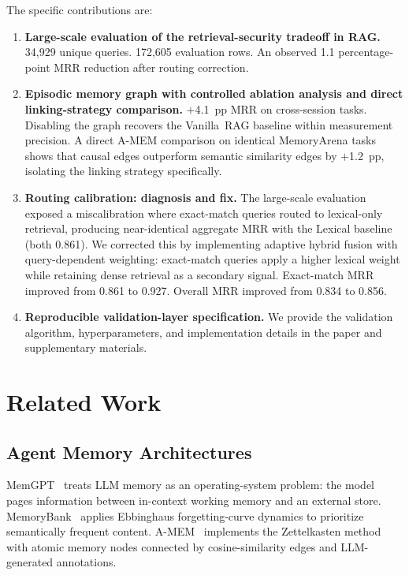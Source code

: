 \documentclass[sigconf]{acmart}
\begin{document}
The specific contributions are:

\begin{enumerate}
\item \textbf{Large-scale evaluation of the retrieval-security tradeoff in RAG.} 34,929 unique queries. 172,605 evaluation rows. An observed 1.1 percentage-point MRR reduction after routing correction.

\item \textbf{Episodic memory graph with controlled ablation analysis and
direct linking-strategy comparison.} $+$4.1~pp MRR on cross-session tasks.
Disabling the graph recovers the Vanilla~RAG baseline within measurement precision. A direct
A-MEM comparison on identical MemoryArena tasks shows that causal
edges outperform semantic similarity edges by $+$1.2~pp, isolating the
linking strategy specifically.

\item \textbf{Routing calibration: diagnosis and fix.} The large-scale
evaluation exposed a miscalibration where exact-match queries routed to
lexical-only retrieval, producing near-identical aggregate MRR with the Lexical
baseline (both 0.861). We corrected this by implementing adaptive hybrid
fusion with query-dependent weighting: exact-match queries apply a higher
lexical weight while retaining dense retrieval as a secondary signal. Exact-match MRR improved from 0.861 to 0.927. Overall MRR
improved from 0.834 to 0.856.

\item \textbf{Reproducible validation-layer specification.} We provide the
validation algorithm, hyperparameters, and implementation details in the
paper and supplementary materials.
\end{enumerate}

\section{Related Work}

\subsection{Agent Memory Architectures}

MemGPT~\cite{packer2023memgpt} treats LLM memory as an operating-system
problem: the model pages information between in-context working memory
and an external store. MemoryBank~\cite{zhong2023memorybank} applies
Ebbinghaus forgetting-curve dynamics to prioritize semantically frequent
content. A-MEM~\cite{xu2025amem} implements the Zettelkasten method with
atomic memory nodes connected by cosine-similarity edges and
LLM-generated annotations.
\end{document}
